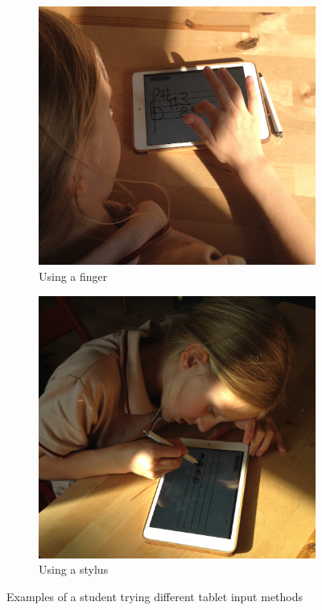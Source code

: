 \begin{figure}[h!]
    \centering
    \begin{subfigure}[b]{.49\linewidth}
        \centering
        \includegraphics[width=\linewidth]{gfx/photos/user-finger.jpg}
        \caption{Using a finger}
    \end{subfigure}
    \begin{subfigure}[b]{.49\linewidth}
        \centering
        \includegraphics[width=\linewidth]{gfx/photos/user-stylus.jpg}
        \caption{Using a stylus}
    \end{subfigure}

    \caption{Examples of a student trying different tablet input methods}
\end{figure}

